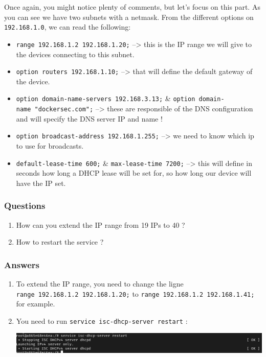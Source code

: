 \documentclass[a4paper,11pt,singlespacing]{article}
\providecommand{\tightlist}{%
  \setlength{\itemsep}{0pt}\setlength{\parskip}{0pt}}
\begin{document}
Once again, you might notice plenty of comments, but let's focus on this
part. As you can see we have two subnets with a netmask. From the
different options on \texttt{192.168.1.0}, we can read the following:

\begin{itemize}
\tightlist
\item
  \texttt{range\ 192.168.1.2\ 192.168.1.20;} --\textgreater{} this is
  the IP range we will give to the devices connecting to this subnet.
\item
  \texttt{option\ routers\ 192.168.1.10;} --\textgreater{} that will
  define the default gateway of the device.
\item
  \texttt{option\ domain-name-servers\ 192.168.3.13;} \&
  \texttt{option\ domain-name\ "dockersec.com";} --\textgreater{} these
  are responsible of the DNS configuration and will specify the DNS
  server IP and name !
\item
  \texttt{option\ broadcast-address\ 192.168.1.255;} --\textgreater{} we
  need to know which ip to use for broadcasts.
\item
  \texttt{default-lease-time\ 600;} \& \texttt{max-lease-time\ 7200;}
  --\textgreater{} this will define in seconds how long a DHCP lease
  will be set for, so how long our device will have the IP set.
\end{itemize}

\subsubsection{Questions}\label{questions-3}

\begin{enumerate}
\def\labelenumi{\arabic{enumi}.}
\tightlist
\item
  How can you extend the IP range from 19 IPs to 40 ?
\item
  How to restart the service ?
\end{enumerate}

\newpage

\subsubsection{Answers}\label{answers-4}

\begin{enumerate}
\def\labelenumi{\arabic{enumi}.}
\item
  To extend the IP range, you need to change the ligne
  \texttt{range\ 192.168.1.2\ 192.168.1.20;} to
  \texttt{range\ 192.168.1.2\ 192.168.1.41;} for example.
\item
  You need to run \texttt{service\ isc-dhcp-server\ restart} :

  \includegraphics{Images/Image13.png}
\end{enumerate}
\end{document}
